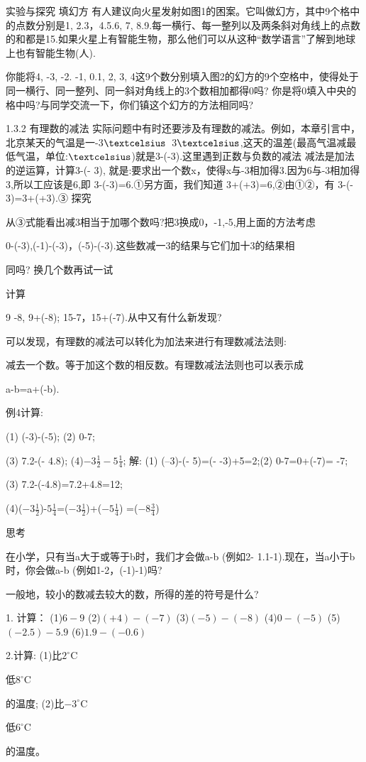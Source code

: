 \documentclass[UTF8]{article}
\begin{document}
实验与探究
填幻方
有人建议向火星发射如图1的困案。它叫做幻方，其中9个格中的点数分别是1, 2.3，4.5.6, 7, 8.9.每一横行、每一整列以及两条斜对角线上的点数的和都是15.如果火星上有智能生物，那么他们可以从这种“数学语言”了解到地球上也有智能生物(人).

你能将4, -3, -2. -1, 0.1, 2, 3, 4这9个数分别填入图2的幻方的9个空格中，使得处于同一横行、同一整列、同一斜对角线上的3个数相加都得0吗?
你是将0填入中央的格中吗?与同学交流一下，你们镇这个幻方的方法相同吗?

1.3.2 有理数的减法
实际问题中有时还要涉及有理数的减法。例如，本章引言中，北京某天的气温是一-3${\textcelsius }$~3${\textcelsius}$,这天的温差(最高气温减最低气温，单位:${\textcelsius }$)就是3-(-3).这里遇到正数与负数的减法
减法是加法的逆运算，计算3-(- 3), 就是:要求出一个数x，使得x与-3相加得3.因为6与-3相加得3,所以工应该是6,即
3-(-3)=6.①另方面，我们知道
3+(+3)=6,②由①②，有
3-(- 3)=3+(+3).③
探究

从③式能看出减3相当于加哪个数吗?把3换成0，-1,-5,用上面的方法考虑

0-(-3),(-1)-(-3)，(-5)-(-3).这些数减一3的结果与它们加十3的结果相

同吗?  换几个数再试一试

计算

9 -8, 9+(-8); 15-7，15+(-7).从中又有什么新发现?

可以发现，有理数的减法可以转化为加法来进行有理数减法法则:

减去一个数。等于加这个数的相反数。有理数减法法则也可以表示成

a-b=a+(-b).

例4计算:

(1) (-3)-(-5);  (2) 0-7;

(3) 7.2-(- 4.8);  (4)$-3\frac{1}{2}-5\frac{1}{4}$;
解: 
(1) (--3)-(- 5)=(- -3)+5=2;(2) 0-7=0+(-7)= -7;

(3) 7.2-(-4.8)=7.2+4.8=12;

(4)($-3\frac{1}{2}$)-$5\frac{1}{4}$=($-3\frac{1}{2}$)+($-5\frac{1}{4}$) =($-8\frac{3}{4}$)

思考

在小学，只有当a大于或等于b时，我们才会做a-b (例如2- 1.1-1).现在，当a小于b时，你会做a-b (例如1-2，(-1)-1)吗?

一般地，较小的数减去较大的数，所得的差的符号是什么?

1. 计算：
(1)$6-9$
(2)$(+4)-(-7)$
(3)$(-5)-(-8)$
(4)$0-(-5)$
(5)$(-2.5)-5.9$
(6)$1.9-(-0.6)$

2.计算:
(1)比$2^\circ$C \par 低$8^\circ$C \par 的温度;
(2)比$-3^\circ$C \par 低$6^\circ$C \par 的温度。
\end{document}
